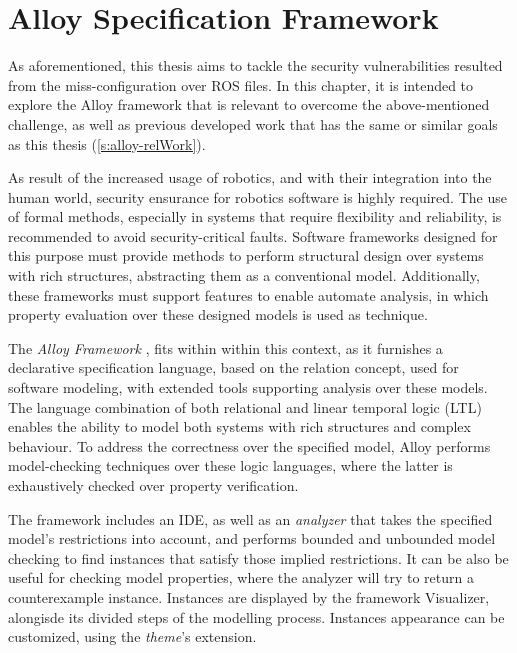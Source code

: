 \chapter{Alloy Specification Framework}\label{c:alloy}

As aforementioned, this thesis aims to tackle the security vulnerabilities resulted from the miss-configuration over ROS files. In this chapter, it is intended to explore the Alloy framework that is relevant to overcome the above-mentioned challenge, as well as previous developed work that has the same or similar goals as this thesis (\ref{s:alloy-relWork}).

As result of the increased usage of robotics, and with their integration into the human world, security ensurance for robotics software is highly required. The use of formal methods, especially in systems that require flexibility and reliability, is recommended to avoid security-critical faults. \cite{carvalho2020analysis} Software frameworks designed for this purpose must provide methods to perform structural design over systems with rich structures, abstracting them as a conventional model. Additionally, these frameworks must support features to enable automate analysis, in which property evaluation over these designed models is used as technique. 

The \textit{Alloy Framework} \cite{alloy-DJ}, fits within within this context, as it furnishes a declarative specification language, based on the relation concept, used for software modeling, with extended tools supporting analysis over these models. \cite{alloy-6} The language combination of both relational and linear temporal logic (LTL) enables the ability to model both systems with rich structures and complex behaviour. To address the correctness over the specified model, Alloy performs model-checking techniques over these logic languages, where the latter is exhaustively checked over property verification. \cite{lwspecification, carvalho2020analysis}

The framework includes an IDE, as well as an \textit{analyzer} that takes the specified model's restrictions into account, and performs bounded and unbounded model checking to find instances that satisfy those implied restrictions. It can be also be useful for checking model properties, where the analyzer will try to return a counterexample instance. Instances are displayed by the framework Visualizer, alongisde its divided steps of the modelling process. Instances appearance can be customized, using the \textit{theme}'s extension. \cite{alloy-6}

